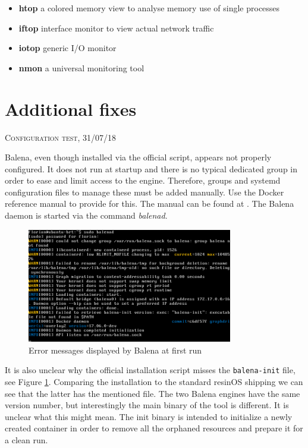 \documentclass[]{scrartcl}
\begin{document}
\begin{itemize}
	\item \textbf{htop} a colored memory view to analyse memory use of single processes
	\item \textbf{iftop} interface monitor to view actual network traffic
	\item \textbf{iotop} generic I/O monitor
	\item \textbf{nmon} a universal monitoring tool
\end{itemize}

\section{Additional fixes}
{\small\textsc{Configuration test, 31/07/18} \bigskip}

Balena, even though installed via the official script, appears not properly configured. It does not run at startup and there is no typical dedicated group in order to ease and limit access to the engine.
Therefore, groups and systemd configuration files to manage these must be added manually. Use the Docker reference manual to provide for this. The manual can be found at \cite{docker02}. The Balena daemon is started via the command \textit{balenad}.

\begin{figure}[t]
	\centering
	\includegraphics[width=0.8\textwidth]{balena-err}
	\caption{Error messages displayed by Balena at first run}
	\label{fig:balenad}
\end{figure}

It is also unclear why the official installation script misses the \texttt{balena-init} file, see Figure \ref{fig:balenad}. 
Comparing the installation to the standard resinOS shipping we can see that the latter has the mentioned file.  The two Balena engines have the same version number, but interestingly the main binary of the tool is different. 
It is unclear what this might mean. The init binary is intended to initialize a newly created container in order to remove all the orphaned resources and prepare it for a clean run. 
\end{document}
